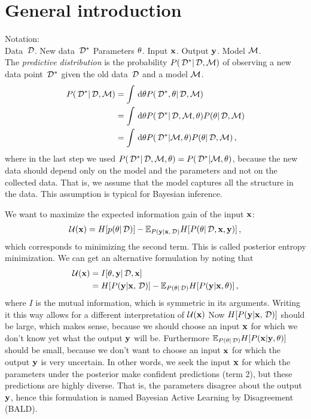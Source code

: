 
\section*{General introduction} %
\label{sec:general_introduction}
Notation: \\
Data $\,\mathcal{D}$. New data $\,\mathcal{D}^*$ Parameters $\theta$. Input ${\bf x}$. Output ${\bf y}$. Model $\mathcal{M}$. \\

The \emph{predictive distribution} is the probability ${P(\,\mathcal{D}^* | \,\mathcal{D}, \mathcal{M})}$ of observing a new data point $\,\mathcal{D}^*$ given the old data $\,\mathcal{D}$ and a model $\mathcal{M}$.
\begin{align*}
	{P(\,\mathcal{D}^* | \,\mathcal{D}, \mathcal{M})}
	&= \int \,\mathrm{d} \theta
		{P(\,\mathcal{D}^*, \theta| \,\mathcal{D}, \mathcal{M})} \\
	&= \int \,\mathrm{d} \theta
		{P(\,\mathcal{D}^* | \,\mathcal{D}, \mathcal{M}, \theta)}
		{P(\theta| \,\mathcal{D}, \mathcal{M})} \\
	&= \int \,\mathrm{d} \theta
		{P(\,\mathcal{D}^* | \mathcal{M}, \theta)}
		{P(\theta| \,\mathcal{D}, \mathcal{M})} \,,
\end{align*}
where in the last step we used ${P(\,\mathcal{D}^* | \,\mathcal{D}, \mathcal{M}, \theta)} = {P(\,\mathcal{D}^* | \mathcal{M}, \theta)}$, because the new data should depend only on the model and the parameters and not on the collected data. That is, we assume that the model captures all the structure in the data. This assumption is typical for Bayesian inference.


We want to maximize the expected information gain of the input ${\bf x}$:
\begin{align}
	\mathcal{U}({\bf x})
	= H[p(\theta | \,\mathcal{D})]
	- \mathbb{E}_{{P({\bf y} | {\bf x}, \,\mathcal{D})}} H[{P(\theta | \,\mathcal{D}, {\bf x}, {\bf y})}] \,,
\end{align}
which corresponds to minimizing the second term. This is called posterior entropy minimization.
We can get an alternative formulation by noting that
\begin{align}
	\mathcal{U}({\bf x})
	&= I[\theta, {\bf y} | \,\mathcal{D}, {\bf x}] \\
	&= H[{P({\bf y} | {\bf x}, \,\mathcal{D})}]
	- \mathbb{E}_{{P(\theta | \,\mathcal{D})}} H[{P({\bf y} | {\bf x}, \theta)}] \,,
\end{align}
where $I$ is the mutual information, which is symmetric in its arguments. Writing it this way allows for a different interpretation of $\mathcal{U}({\bf x})$
Now $H[{P({\bf y} | {\bf x}, \,\mathcal{D})}]$ should be large, which makes sense, because we should choose an input ${\bf x}$ for which we don't know yet what the output ${\bf y}$ will be. Furthermore $\mathbb{E}_{{P(\theta | \,\mathcal{D})}} H[{P({\bf x} | {\bf y}, \theta)}]$ should be small, because we don't want to choose an input ${\bf x}$ for which the output ${\bf y}$ is very uncertain.
In other words, we seek the input ${\bf x}$ for which the parameters under the posterior make confident predictions (term 2), but these predictions are highly diverse. That is, the parameters disagree about the output ${\bf y}$, hence this formulation is named Bayesian Active Learning by Disagreement (BALD).

